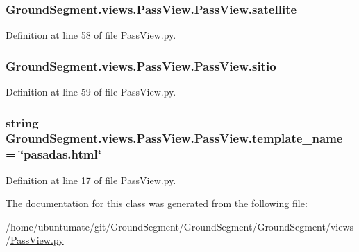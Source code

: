 \subsubsection[{satellite}]{\setlength{\rightskip}{0pt plus 5cm}Ground\+Segment.\+views.\+Pass\+View.\+Pass\+View.\+satellite}\label{class_ground_segment_1_1views_1_1_pass_view_1_1_pass_view_a639aabe3c613cfcc64dde52d282f1bac}


Definition at line 58 of file Pass\+View.\+py.

\hypertarget{class_ground_segment_1_1views_1_1_pass_view_1_1_pass_view_a0eb396ce85cf67090e75aded4f3e5f14}{}
\subsubsection[{sitio}]{\setlength{\rightskip}{0pt plus 5cm}Ground\+Segment.\+views.\+Pass\+View.\+Pass\+View.\+sitio}\label{class_ground_segment_1_1views_1_1_pass_view_1_1_pass_view_a0eb396ce85cf67090e75aded4f3e5f14}


Definition at line 59 of file Pass\+View.\+py.

\hypertarget{class_ground_segment_1_1views_1_1_pass_view_1_1_pass_view_a3d229346028d5c772ec877cc7424d52a}{}
\subsubsection[{template\+\_\+name}]{\setlength{\rightskip}{0pt plus 5cm}string Ground\+Segment.\+views.\+Pass\+View.\+Pass\+View.\+template\+\_\+name = \char`\"{}pasadas.\+html\char`\"{}\hspace{0.3cm}{\ttfamily [static]}}\label{class_ground_segment_1_1views_1_1_pass_view_1_1_pass_view_a3d229346028d5c772ec877cc7424d52a}


Definition at line 17 of file Pass\+View.\+py.



The documentation for this class was generated from the following file\+:\begin{DoxyCompactItemize}
\item 
/home/ubuntumate/git/\+Ground\+Segment/\+Ground\+Segment/\+Ground\+Segment/views/\hyperlink{_pass_view_8py}{Pass\+View.\+py}\end{DoxyCompactItemize}
